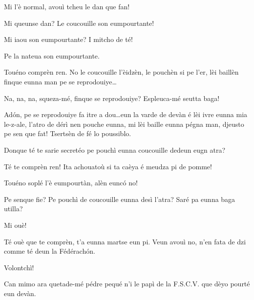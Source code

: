 \begin{drama}
\Tuenospeaks Mi l'è normal, avouì tcheu le dan que fan!

\Richardspeaks Mi queunse dan? Le coucouille son eumpourtante! 

\Tuenospeaks Mi iaou son eumpourtante? I mitcho de té!

\Gerominespeaks Pe la nateua son eumpourtante.

\Richardspeaks{} Touéno comprèn ren. No le coucouille l'èidzèn, le pouchèn si pe l'er, lèi baillèn finque eunna man pe se reprodouiye\ldots

\Tuenospeaks{} Na, na, na, squeza-mé, finque se reprodouiye? Espleuca-mé seutta baga!

\Richardspeaks Ad\'on, pe se reprodouiye fa itre a dou\ldots eun la varde de devàn é lèi ivre eunna mia le-z-ale, l'atro de dérì nen pouche eunna, mi lèi baille eunna pégna man, djeusto pe sen que fat! Tsertsèn de fé lo poussiblo.

\Tuenospeaks Donque té te sarie secretéo pe pouchì eunna coucouille dedeun eugn atra?

\Richardspeaks Té te comprèn ren! Ita achouatoù si ta caèya é meudza pi de pomme!

\Gerominespeaks{} Touéno soplé l'è eumpourtàn, alèn eunc\'o no!

\Tuenospeaks Pe senque fie? Pe pouchì de coucouille eunna desì l'atra? Saré pa eunna baga utilla?

\Gerominespeaks Mi ouè!

\Richardspeaks{} Té ouè que te comprèn, t'a eunna martse eun pi. Veun avouì no, n'en fata de dzi comme té deun la Fédérach\'on.

\Gerominespeaks Volontchì!


\Richardspeaks Can mimo ara quetade-mé pédre pequé n'i le papì de la F.S.C.V. que dèyo pourté eun devàn.






\end{drama}
